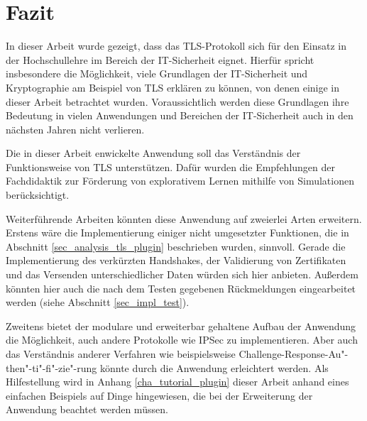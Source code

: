 \chapter{Fazit}


In dieser Arbeit wurde gezeigt, dass das TLS-Protokoll sich für den Einsatz in der Hochschullehre im Bereich der IT-Sicherheit eignet. Hierfür spricht insbesondere die Möglichkeit, viele Grundlagen der IT-Sicherheit und Kryptographie am Beispiel von TLS erklären zu können, von denen einige in dieser Arbeit betrachtet wurden. Voraussichtlich werden diese Grundlagen ihre Bedeutung in vielen Anwendungen und Bereichen der IT-Sicherheit auch in den nächsten Jahren nicht verlieren.

Die in dieser Arbeit enwickelte Anwendung soll das Verständnis der Funktionsweise von TLS unterstützen. Dafür wurden die Empfehlungen der Fachdidaktik zur Förderung von explorativem Lernen mithilfe von Simulationen berücksichtigt.


Weiterführende Arbeiten könnten diese Anwendung auf zweierlei Arten erweitern. Erstens wäre die Implementierung einiger nicht umgesetzter Funktionen, die in Abschnitt \ref{sec_analysis_tls_plugin} beschrieben wurden, sinnvoll. Gerade die Implementierung des verkürzten Handshakes, der Validierung von Zertifikaten und das Versenden unterschiedlicher Daten würden sich hier anbieten. Außerdem könnten hier auch die nach dem Testen gegebenen Rückmeldungen eingearbeitet werden (siehe Abschnitt \ref{sec_impl_test}).

Zweitens bietet der modulare und erweiterbar gehaltene Aufbau der Anwendung die Möglichkeit, auch andere Protokolle wie IPSec zu implementieren. Aber auch das Verständnis anderer Verfahren wie beispielsweise Challenge-Response-Au"-then"-ti"-fi"-zie"-rung könnte durch die Anwendung erleichtert werden. Als Hilfestellung wird in Anhang \ref{cha_tutorial_plugin} dieser Arbeit anhand eines einfachen Beispiels auf Dinge hingewiesen, die bei der Erweiterung der Anwendung beachtet werden müssen.